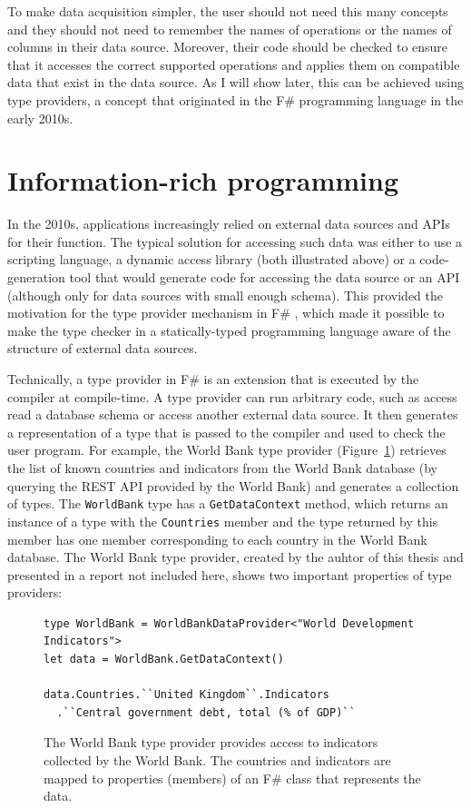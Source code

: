 \documentclass[fleqn,11pt]{report}
\theoremstyle{definition}
\begin{document}
To make data acquisition simpler, the user should not need this many concepts and they should not
need to remember the names of operations or the names of columns in their data source.
Moreover, their code should be checked to ensure that it accesses the correct supported
operations and applies them on compatible data that exist in the data source. As I will show later,
this can be achieved using type providers, a concept that originated in the F\# programming language
in the early 2010s.

\section{Information-rich programming}
In the 2010s, applications increasingly relied on external data sources and APIs for their
function. The typical solution for accessing such data was either to use a scripting language,
a dynamic access library (both illustrated above) or a code-generation tool that would generate
code for accessing the data source or an API (although only for data sources with small enough
schema). This provided the motivation for the type provider mechanism in F\#
\citep{syme-2012-providers,syme-2013-inforich}, which made it possible to make the type checker
in a statically-typed programming language aware of the structure of external data sources.

Technically, a type provider in F\# is an extension that is executed by the compiler at
compile-time. A type provider can run arbitrary code, such as access read a database schema or
access another external data source. It then generates a representation of a type that is
passed to the compiler and used to check the user program. For example, the World Bank
type provider (Figure~\ref{fig:wb}) retrieves the list of known countries and indicators from
the World Bank database (by querying the REST API provided by the World Bank) and generates
a collection of types. The \texttt{WorldBank} type has a \texttt{GetDataContext} method, which
returns an instance of a type with the \texttt{Countries} member and the type returned by this
member has one member corresponding to each country in the World Bank database.
The World Bank type provider, created by the auhtor of this thesis and presented in a report
\citep{syme-2012-providers} not included here, shows two important properties of type providers:

\begin{figure}[t]
\begin{lstlisting}[language=sharp]
type WorldBank = WorldBankDataProvider<"World Development Indicators">
let data = WorldBank.GetDataContext()

data.Countries.``United Kingdom``.Indicators
  .``Central government debt, total (% of GDP)``
\end{lstlisting}
\vspace{-0.5em}
\caption{The World Bank type provider \citep{syme-2012-providers} provides access to indicators
collected by the World Bank. The countries and indicators are mapped to properties (members)
of an F\# class that represents the data.}
\vspace{-0.5em}
\label{fig:wb}
\end{figure}
\end{document}
